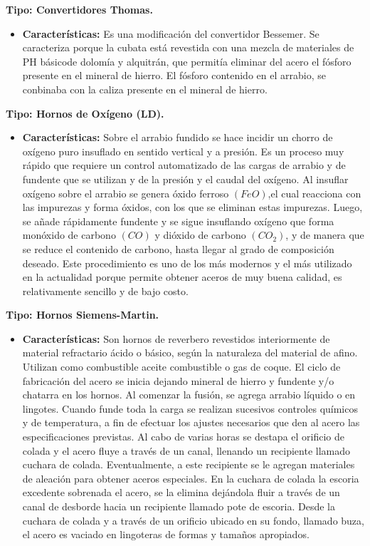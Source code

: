 \documentclass[12pt,a4paper]{article}
\begin{document}
\textbf{Tipo: Convertidores Thomas.}

\begin{itemize}
    \item \textbf{Características:} 
    Es una modificación del convertidor Bessemer. Se caracteriza porque la cubata está revestida con una mezcla  de materiales de PH básicode dolomía y alquitrán, que permitía eliminar del acero el fósforo presente en el mineral de hierro. El fósforo contenido en el arrabio, se conbinaba con la caliza presente en el  mineral de hierro.
\end{itemize}

\textbf{Tipo: Hornos de Oxígeno (LD).}

\begin{itemize}
    \item \textbf{Características:} 
    Sobre el arrabio fundido se hace incidir un chorro de oxígeno puro insuflado en sentido vertical y a presión. Es un proceso muy rápido que requiere un control automatizado de las cargas de arrabio y de fundente que se utilizan y de la presión y el caudal del oxígeno. Al insuflar oxígeno sobre el arrabio se genera óxido ferroso $(FeO)$,el cual reacciona con las impurezas y forma óxidos, con los que se eliminan estas impurezas. Luego, se añade rápidamente fundente y se sigue insuflando oxígeno que forma monóxido de carbono $(CO)$ y dióxido de carbono $(CO_2)$, y de manera que se reduce el contenido de carbono, hasta llegar al grado de composición deseado.
    Este procedimiento es uno de los más modernos y el más utilizado en la actualidad porque permite obtener aceros de muy buena calidad, es relativamente sencillo y de bajo costo.
\end{itemize}

\textbf{Tipo: Hornos Siemens-Martin.}

\begin{itemize}
    \item \textbf{Características:} 
    Son hornos de reverbero revestidos interiormente de material refractario ácido o básico, según la naturaleza del material de afino. Utilizan como combustible aceite combustible o gas de coque. El ciclo de fabricación del acero se inicia dejando mineral de hierro y fundente y/o chatarra en los hornos. Al comenzar la fusión, se agrega arrabio líquido o en lingotes. Cuando funde toda la carga se realizan sucesivos controles químicos y de temperatura, a fin de efectuar los ajustes necesarios que den al acero las especificaciones previstas. Al cabo de varias horas se destapa el orificio de colada y el acero fluye a través de un canal, llenando un recipiente llamado cuchara de colada. Eventualmente, a este recipiente se le agregan materiales de aleación para obtener aceros especiales. En la cuchara de colada la escoria excedente sobrenada el acero, se la elimina dejándola fluir a través de un canal de desborde hacia un recipiente llamado pote de escoria. 
    Desde la cuchara de colada y a través de un orificio ubicado en su fondo, llamado buza, el acero es vaciado en lingoteras de formas y tamaños apropiados.
\end{itemize}
\end{document}
